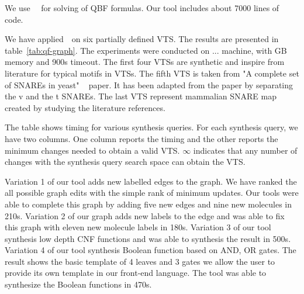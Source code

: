 %
We use~\depqbf~\cite{lonsing2010depqbf} for solving of QBF formulas. 
%
Our tool includes about 7000 lines of code.

We have applied~\ourtool~on six partially defined VTS.
%
The results are presented in table~\ref{tab:qf-graph}.
%
The experiments were conducted on ... machine,
with GB memory and 900s timeout.
%
The first four VTSs are synthetic and inspire from literature for typical
motifs in VTSs. 
%
%
The fifth VTS is taken from "A complete set of SNAREs in yeast"
~\cite{burri2004complete} paper. It has been adapted from the paper by separating the v and the t SNAREs. 
%
The last VTS represent mammalian SNARE map created by studying the literature references.  

The table shows timing for various synthesis queries.
%
For each synthesis query, we have two columns.
%
One column reports the timing and the other reports the minimum changes
needed to obtain a valid VTS.
%
$\infty$ indicates that any number of changes with the synthesis query
search space can obtain the VTS.
%

Variation 1 of our tool adds new labelled edges to the graph. We have ranked the all possible graph edits with the simple rank of minimum updates. Our tools were able to complete this graph by adding five new edges and nine new molecules in 210s. Variation 2 of our graph adds new labels to the edge and was able to fix this graph with eleven new molecule labels in 180s. Variation 3 of our tool synthesis low depth CNF functions and was able to synthesis the result in 500s. Variation 4 of our tool synthesis Boolean function based on AND, OR gates. The result shows the basic template of 4 leaves and 3 gates we allow the user to provide its own template in our front-end language. The tool was able to synthesize the Boolean functions in 470s.
%
%
%


